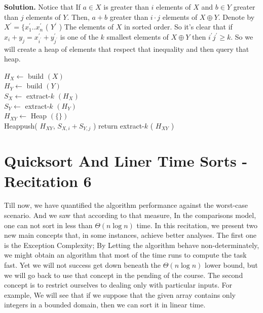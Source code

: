 \textbf{Solution.} Notice that If $a \in X$ is greater than $i$ elements of $X$ and $b \in Y$ greater than $j$ elements of $Y$. Then, $a + b$  greater than $i\cdot j$ elements of $X \oplus Y$. Denote by $X^\prime = \{ x^{\prime}_{1} .. x^{\prime}_{n}$ ( $Y^{\prime}$ ) The elements of $X$ in sorted order. So it's clear that if $x_{i}+y_{j} = x^{\prime}_{i^{\prime}} + y^{\prime}_{j^{\prime}}$ is one of the $k$ smallest elements of $X\oplus Y$ then $i^{\prime}j^{\prime} \ge k$. So we will create a heap of elements that respect that inequality and then query that heap.


\begin{algorithm}[H]
$ H_{X} \leftarrow $ build $\left( X \right)$  \\ 
$ H_{Y} \leftarrow $ build $\left( Y \right)$  \\
$ S_{X} \leftarrow $ extract-$k$ $\left( H_{X} \right)$  \\ 
$ S_{Y} \leftarrow $ extract-$k$ $\left( H_{Y} \right)$  \\
$ H_{XY} \leftarrow $ Heap $(\{ \} )$ \\
 {
   {
  	Heappush( $H_{XY}$, $S_{X,i} + S_{Y, j}$ )    
  }
}
return extract-$k$ ( $H_{XY}$ ) 
\end{algorithm}

\fi



\section{Quicksort And Liner Time Sorts  - Recitation 6} 
\author{Quicksort, Countingsort, Radixsort, And Bucketsort.}


Till now, we have quantified the algorithm performance against the worst-case scenario. And we saw that according to that measure, In the comparisons model, one can not sort in less than $\Theta\left( n\log n \right) $ time. In this recitation, we present two new main concepts that, in some instances, achieve better analyses. The first one is the Exception Complexity; By Letting the algorithm behave non-determinately, we might obtain an algorithm that most of the time runs to compute the task fast. Yet we will not success get down beneath the $\Theta\left(n\log n\right)$ lower bound, but we will go back to use that concept in the pending of the course. The second concept is to restrict ourselves to dealing only with particular inputs. For example, We will see that if we suppose that the given array contains only integers in a bounded domain, then we can sort it in linear time.  

